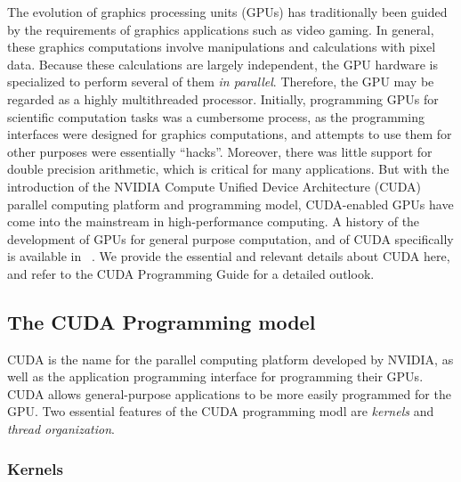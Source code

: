 The evolution of graphics processing units (GPUs)
has traditionally been guided by the requirements
of graphics applications such as video gaming.
In general, these graphics computations involve
manipulations and calculations with pixel data.
Because these calculations are largely independent,
the GPU hardware is specialized
to perform several of them \emph{in parallel}.
Therefore, the
GPU may be regarded as a highly multithreaded processor.
Initially,
programming GPUs for scientific computation tasks
was a cumbersome process,
as the programming interfaces were designed for graphics computations,
and attempts to use them for other purposes were essentially ``hacks''.
Moreover, there was little support for double precision arithmetic,
which is critical for many applications.
But with the introduction of the
NVIDIA Compute Unified Device Architecture (CUDA)
parallel computing platform
and programming model,
CUDA-enabled GPUs have come into the
mainstream in high-performance computing.
A history of the development of GPUs
for general purpose computation,
and of CUDA specifically is available
in ~\cite{HwuBook}.
We provide the essential and relevant details about CUDA here,
and refer to the
CUDA Programming Guide \cite{CUDAProgrammingGuide}
for a detailed outlook.

\subsection{The CUDA Programming model}

CUDA is the name for the parallel computing platform
developed by NVIDIA,
as well as the application programming interface
for programming their GPUs.
CUDA allows general-purpose applications to be
more easily programmed for the GPU.
Two essential features of the CUDA programming modl
are \emph{kernels} and \emph{thread organization}.

\subsubsection{Kernels}

